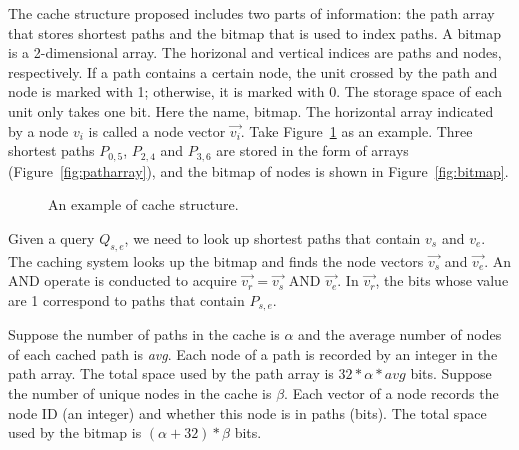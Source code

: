The cache structure proposed includes two parts of information: the path array that stores shortest paths and the bitmap that is used to index paths.
A bitmap is a 2-dimensional array.
The horizonal and vertical indices are paths and nodes, respectively.
If a path contains a certain node, the unit crossed by the path and node is marked with 1; otherwise, it is marked with 0.
The storage space of each unit only takes one bit. Here the name, bitmap.
The horizontal array indicated by a node $v_i$ is called a node vector $\vec{v_i}$.
Take Figure~\ref{fig:cache_structure} as an example. Three shortest paths $P_{0,5}$, $P_{2,4}$ and $P_{3,6}$ are stored in the form of arrays (Figure~\ref{fig:patharray}), and the bitmap of nodes is shown in Figure~\ref{fig:bitmap}.

\begin{figure}[htbp]
\centering
 \caption{An example of cache structure.}
 \label{fig:cache_structure}
\end{figure}



Given a query $Q_{s,e}$, we need to look up shortest paths that contain $v_s$ and $v_e$. The caching system looks up the bitmap and finds the node vectors $\vec{v_s}$ and $\vec{v_e}$. An AND operate is conducted to acquire $\vec{v_r}=\vec{v_s}$ AND $\vec{v_e}$. In $\vec{v_r}$, the bits whose value are 1 correspond to paths that contain $P_{s,e}$.



Suppose the number of paths in the cache is $\alpha$ and the average number of nodes of each cached path is \textit{avg}. Each node of a path is recorded by an integer in the path array. The total space used by the path array is $32*\alpha * \textit{avg}$ bits. Suppose the number of unique nodes in the cache is $\beta$. Each vector of a node records the node ID (an integer) and whether this node is in paths (bits).
The total space used by the bitmap is $(\alpha+32) * \beta$ bits.

